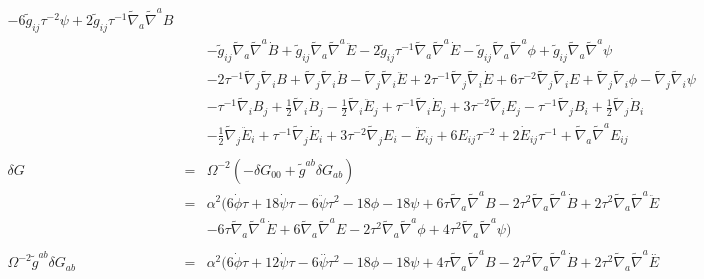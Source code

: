 \documentclass[10pt,letterpaper]{article}
\numberwithin{equation}{section}
\begin{document}
\begin{eqnarray}
- 6 \tilde{g}_{ij} \tau^{-2} \psi
+ 2 \tilde{g}_{ij} \tau^{-1} \tilde{\nabla}_{a}\tilde{\nabla}^{a}B\nonumber\\
&& -  \tilde{g}_{ij} \tilde{\nabla}_{a}\tilde{\nabla}^{a}\dot{B}
+ \tilde{g}_{ij} \tilde{\nabla}_{a}\tilde{\nabla}^{a}\ddot{E}
- 2 \tilde{g}_{ij} \tau^{-1} \tilde{\nabla}_{a}\tilde{\nabla}^{a}\dot{E}
-  \tilde{g}_{ij} \tilde{\nabla}_{a}\tilde{\nabla}^{a}\phi
+ \tilde{g}_{ij} \tilde{\nabla}_{a}\tilde{\nabla}^{a}\psi\nonumber\\
&& - 2 \tau^{-1} \tilde{\nabla}_{j}\tilde{\nabla}_{i}B
+ \tilde{\nabla}_{j}\tilde{\nabla}_{i}\dot{B}
-  \tilde{\nabla}_{j}\tilde{\nabla}_{i}\ddot{E}
+ 2 \tau^{-1} \tilde{\nabla}_{j}\tilde{\nabla}_{i}\dot{E}
+ 6 \tau^{-2} \tilde{\nabla}_{j}\tilde{\nabla}_{i}E
+ \tilde{\nabla}_{j}\tilde{\nabla}_{i}\phi
-  \tilde{\nabla}_{j}\tilde{\nabla}_{i}\psi
\nonumber\\
&&- \tau^{-1} \tilde{\nabla}_{i}B_{j}
+ \tfrac{1}{2} \tilde{\nabla}_{i}\dot{B}_{j}
-  \tfrac{1}{2} \tilde{\nabla}_{i}\ddot{E}_{j}
+ \tau^{-1} \tilde{\nabla}_{i}\dot{E}_{j}
+ 3 \tau^{-2} \tilde{\nabla}_{i}E_{j}
-  \tau^{-1} \tilde{\nabla}_{j}B_{i}
+ \tfrac{1}{2} \tilde{\nabla}_{j}\dot{B}_{i}\nonumber\\
&& -  \tfrac{1}{2} \tilde{\nabla}_{j}\ddot{E}_{i}
+ \tau^{-1} \tilde{\nabla}_{j}\dot{E}_{i}
+ 3 \tau^{-2} \tilde{\nabla}_{j}E_{i}
- \ddot{E}_{ij}
+ 6 E_{ij} \tau^{-2}
+ 2 \dot{E}_{ij} \tau^{-1}
+ \tilde{\nabla}_{a}\tilde{\nabla}^{a}E_{ij}
\\ \nonumber\\
\delta G&=& \Omega^{-2}(-\delta G_{00} + \tilde g^{ab}\delta G_{ab})
\nonumber\\
&=&\alpha^2( 6 \dot{\phi} \tau
+ 18 \dot{\psi} \tau
- 6 \ddot{\psi} \tau^2
- 18 \phi
- 18 \psi
+ 6 \tau \tilde{\nabla}_{a}\tilde{\nabla}^{a}B
- 2 \tau^2 \tilde{\nabla}_{a}\tilde{\nabla}^{a}\dot{B}
+ 2 \tau^2 \tilde{\nabla}_{a}\tilde{\nabla}^{a}\ddot{E}\nonumber\\
&& - 6 \tau \tilde{\nabla}_{a}\tilde{\nabla}^{a}\dot{E}
+ 6 \tilde{\nabla}_{a}\tilde{\nabla}^{a}E
- 2 \tau^2 \tilde{\nabla}_{a}\tilde{\nabla}^{a}\phi
+ 4 \tau^2 \tilde{\nabla}_{a}\tilde{\nabla}^{a}\psi)
\\ \nonumber\\
\Omega^{-2}\tilde g^{ab}\delta G_{ab} &=& \alpha^2\big(
6 \dot{\phi} \tau
+ 12 \dot{\psi} \tau
- 6 \overset{..}{\psi} \tau^2
- 18 \phi
- 18 \psi
+ 4 \tau \tilde \nabla_{a}\tilde \nabla^{a}B
- 2 \tau^2 \tilde \nabla_{a}\tilde \nabla^{a}\dot{B}
+ 2 \tau^2 \tilde \nabla_{a}\tilde \nabla^{a}\overset{..}{E}\nonumber\\

\end{eqnarray}
\end{document}
